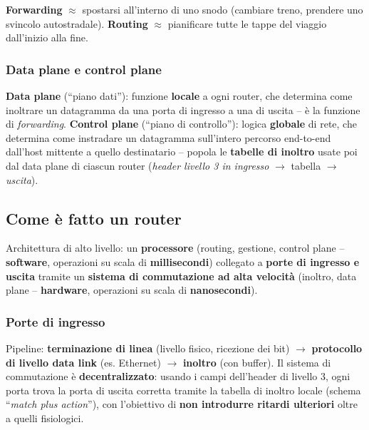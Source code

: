 \documentclass[12pt, a4paper]{article}
\begin{document}
\begin{tcolorbox}[colback=teal!5, colframe=teal!60!black, title=\textbf{Analogia: fare un viaggio}]
\textbf{Forwarding} $\approx$ spostarsi all'interno di uno snodo (cambiare treno, prendere uno svincolo autostradale). \textbf{Routing} $\approx$ pianificare tutte le tappe del viaggio dall'inizio alla fine.
\end{tcolorbox}

\subsubsection{Data plane e control plane}

\textbf{Data plane} (``piano dati''): funzione \textbf{locale} a ogni router, che determina come inoltrare un datagramma da una porta di ingresso a una di uscita -- è la funzione di \textit{forwarding}. \textbf{Control plane} (``piano di controllo''): logica \textbf{globale} di rete, che determina come instradare un datagramma sull'intero percorso end-to-end dall'host mittente a quello destinatario -- popola le \textbf{tabelle di inoltro} usate poi dal data plane di ciascun router (\textit{header livello 3 in ingresso} $\to$ tabella $\to$ \textit{uscita}).

\subsection{Come è fatto un router}

Architettura di alto livello: un \textbf{processore} (routing, gestione, control plane -- \textbf{software}, operazioni su scala di \textbf{millisecondi}) collegato a \textbf{porte di ingresso e uscita} tramite un \textbf{sistema di commutazione ad alta velocità} (inoltro, data plane -- \textbf{hardware}, operazioni su scala di \textbf{nanosecondi}).

\subsubsection{Porte di ingresso}

Pipeline: \textbf{terminazione di linea} (livello fisico, ricezione dei bit) $\to$ \textbf{protocollo di livello data link} (es. Ethernet) $\to$ \textbf{inoltro} (con buffer). Il sistema di commutazione è \textbf{decentralizzato}: usando i campi dell'header di livello 3, ogni porta trova la porta di uscita corretta tramite la tabella di inoltro locale (schema ``\textit{match plus action}''), con l'obiettivo di \textbf{non introdurre ritardi ulteriori} oltre a quelli fisiologici.
\end{document}
